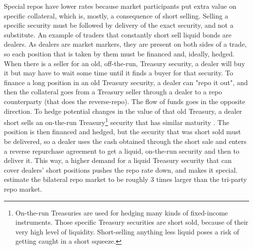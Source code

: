 \documentclass[11pt,a4paper,english,oneside]{article}
\begin{document}
Special repos have lower rates because market participants put extra value on specific collateral, which is, mostly, a consequence of short selling. Selling a specific security must be followed by delivery of the exact security, and not a substitute. An example of traders that constantly short sell liquid bonds are dealers. As dealers are market markers, they are present on both sides of a trade, so each position that is taken by them must be financed and, ideally, hedged. When there is a seller for an old, off-the-run, Treasury security, a dealer will buy it but may have to wait some time until it finds a buyer for that security. To finance a long position in an old Treasury security, a dealer can "repo it out", and then the collateral goes from a Treasury seller through a dealer to a repo counterparty (that does the reverse-repo). The flow of funds goes in the opposite direction. To hedge potential changes in the value of that old Treasury, a dealer short sells an on-the-run Treasury\footnote{On-the-run Treasuries are used for hedging many kinds of fixed-income instruments. Those specific Treasury securities are short sold, because of their very high level of liquidity. Short-selling anything less liquid poses a risk of getting caught in a short squeeze.} security that has similar maturity \citep{fisher2002}. The position is then financed and hedged, but the security that was short sold must be delivered, so a dealer uses the cash obtained through the short sale and enters a reverse repurchase agreement to get a liquid, on-the-run security and then to deliver it. This way, a higher demand for a liquid Treasury security that can cover dealers' short positions pushes the repo rate down, and makes it special. \citet{gorton2012} estimate the bilateral repo market to be roughly 3 times larger than the tri-party repo market.
\end{document}
